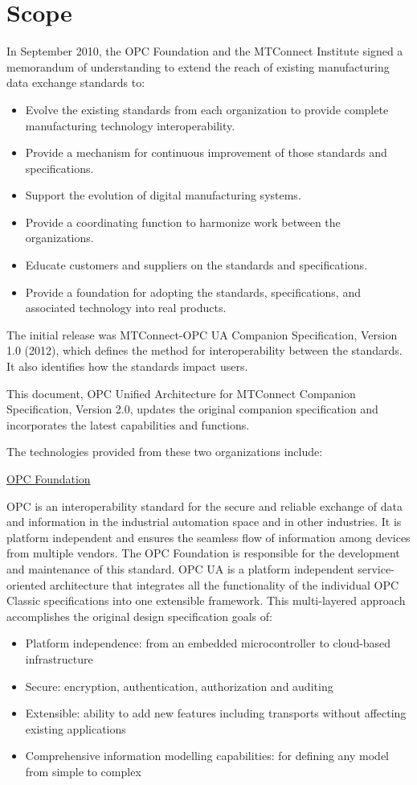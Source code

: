 \section{Scope}\label{scope}

In September 2010, the OPC Foundation and the MTConnect Institute signed a memorandum of understanding to extend the reach of existing manufacturing data exchange standards to:

\begin{itemize}
    \item Evolve the existing standards from each organization to provide complete manufacturing technology interoperability.
    \item Provide a mechanism for continuous improvement of those standards and specifications.
    \item Support the evolution of digital manufacturing systems.  
    \item Provide a coordinating function to harmonize work between the organizations.
    \item Educate customers and suppliers on the standards and specifications.
    \item Provide a foundation for adopting the standards, specifications, and associated technology into real products.
\end{itemize}

The initial release was MTConnect-OPC UA Companion Specification, Version 1.0 (2012), which defines the method for interoperability between the standards. It also identifies how the standards impact users.

This document, OPC Unified Architecture for MTConnect Companion Specification, Version 2.0, updates the original companion specification and incorporates the latest capabilities and functions.   

The technologies provided from these two organizations include:

\quad\underline{OPC Foundation}

OPC is an interoperability standard for the secure and reliable exchange of data and information in the industrial automation space and in other industries.  It is platform independent and ensures the seamless flow of information among devices from multiple vendors. The OPC Foundation is responsible for the development and maintenance of this standard.
OPC UA is a platform independent service-oriented architecture that integrates all the functionality of the individual OPC Classic specifications into one extensible framework. This multi-layered approach accomplishes the original design specification goals of:
\begin{itemize}
    \item Platform independence: from an embedded microcontroller to cloud-based infrastructure
    \item Secure: encryption, authentication, authorization and auditing
    \item Extensible: ability to add new features including transports without affecting existing applications
    \item Comprehensive information modelling capabilities: for defining any model from simple to complex 
\end{itemize} 

